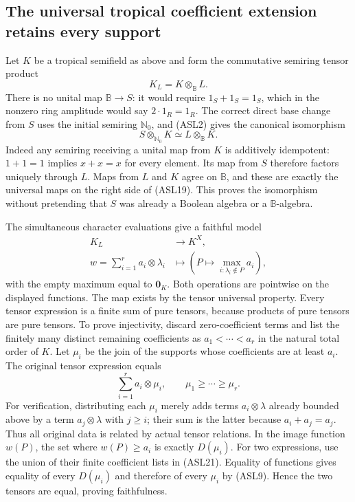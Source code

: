 \subsection{The universal tropical coefficient extension retains every support}

Let $K$ be a tropical semifield as above and form the commutative
semiring tensor product
\begin{equation}\tag{ASL18}
 K_L=K\otimes_{\mathbb B}L.
\end{equation}
There is no unital map $\mathbb B\to S$: it would require
$1_S+1_S=1_S$, which in the nonzero ring amplitude would say
$2\cdot1_R=1_R$. The correct direct base change from $S$ uses the
initial semiring $\mathbb N_0$, and (ASL2) gives the canonical
isomorphism
\begin{equation}\tag{ASL19}
 S\otimes_{\mathbb N_0}K\simeq L\otimes_{\mathbb B}K.
\end{equation}
Indeed any semiring receiving a unital map from $K$ is additively
idempotent: $1+1=1$ implies $x+x=x$ for every element. Its map from
$S$ therefore factors uniquely through $L$. Maps from $L$ and $K$
agree on $\mathbb B$, and these are exactly the universal maps on
the right side of (ASL19). This proves the isomorphism without
pretending that $S$ was already a Boolean algebra or a
$\mathbb B$-algebra.

The simultaneous character evaluations give a faithful model
\begin{equation}\tag{ASL20}
 \begin{split}
 K_L&\longrightarrow K^X,\\
 w=\sum_{i=1}^r a_i\otimes\lambda_i
    &\longmapsto\left(P\longmapsto
          \max_{i:\lambda_i\notin P}a_i\right),
 \end{split}
\end{equation}
with the empty maximum equal to $\mathbf0_K$.
Both operations are pointwise on the displayed functions. The map
exists by the tensor universal property. Every tensor expression is
a finite sum of pure tensors, because products of pure tensors are
pure tensors. To prove injectivity, discard zero-coefficient terms
and list the finitely many distinct remaining coefficients as
$a_1<\cdots<a_r$ in the natural total order of $K$. Let
$\mu_i$ be the join of the supports whose coefficients are at least
$a_i$. The original tensor expression equals
\begin{equation}\tag{ASL21}
 \sum_{i=1}^r a_i\otimes\mu_i,
 \qquad \mu_1\ge\cdots\ge\mu_r.
\end{equation}
For verification, distributing each $\mu_i$ merely adds terms
$a_i\otimes\lambda$ already bounded above by a term
$a_j\otimes\lambda$ with $j\ge i$; their sum is the latter because
$a_i+a_j=a_j$. Thus all original data is related by actual tensor
relations. In the image function $w(P)$, the set where $w(P)\ge a_i$
is exactly $D(\mu_i)$. For two expressions, use the union of their
finite coefficient lists in (ASL21). Equality of functions gives
equality of every $D(\mu_i)$ and therefore of every $\mu_i$ by
(ASL9). Hence the two tensors are equal, proving faithfulness.

